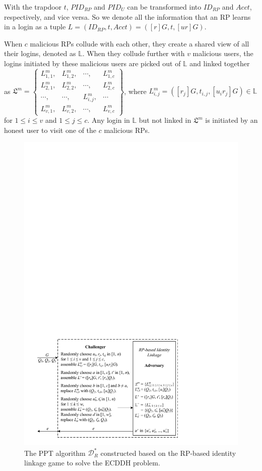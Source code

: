With the trapdoor $t$, $PID_{RP}$ and $PID_U$ can be transformed into $ID_{RP}$ and $Acct$, respectively, and vice versa.
So we denote all the information that an RP learns in a login as a tuple $L =(ID_{RP}, t, Acct)=([r]G, t, [ur]G)$.

When $c$ malicious RPs collude with each other, they create a shared view of all their logins, denoted as $\mathbb{L}$.
When they collude further with $v$ malicious users, the logins initiated by these malicious users are picked out of $\mathbb{L}$ and linked together as
$\mathfrak{L}^m=\left \{ \begin{matrix}
L^m_{1,1},&L^m_{1,2},&\cdots,&L^m_{1,c}\\
L^m_{2,1},& L^m_{2,2},&\cdots,&L^m_{2,c}\\
\cdots,&\cdots,&L^m_{i,j},&\cdots\\
L^m_{v,1},&L^m_{v,2},&\cdots,&L^m_{v,c}
\end{matrix}\right\}$,
where $L^m_{i, j}=([r_j]G, t_{i,j}, [u_ir_j]G) \in \mathbb{L}$ for $1 \le i \le v$ and $1 \le j \le c$. Any login in $\mathbb{L}$ but not linked in $\mathfrak{L}^m$ is initiated by an honest user to visit one of the $c$ malicious RPs.

\begin{figure}[tb]
  \centering
  \includegraphics[width=1.0\linewidth]{fig/rp-linkage-game.pdf}
  \caption{The PPT algorithm $\mathcal{D}^*_R$ constructed based on the RP-based identity linkage game to solve the ECDDH problem.}
  \label{fig:dalgorithm}
\end{figure}


